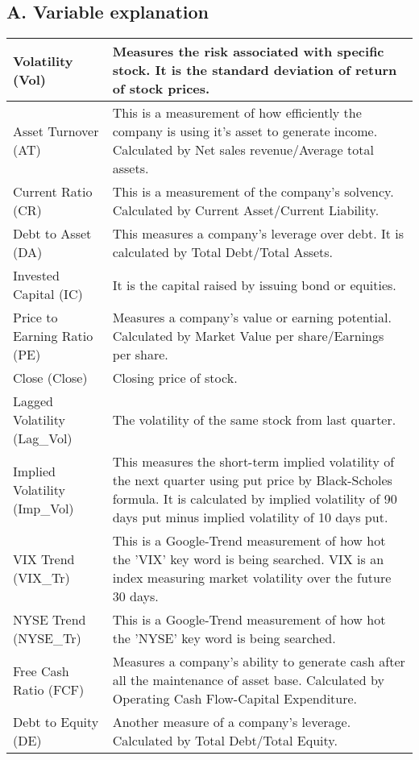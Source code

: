 \documentclass[b4paper]{article}
\begin{document}
\subsection{A. Variable explanation}
\begin{center}
\begin{tabular}{ |p{5cm} | p{10cm} | }
 \hline
Volatility (Vol) &  Measures the risk associated with specific stock. It is the standard deviation of return of stock prices. \\
 \hline
Asset Turnover (AT) & This is a measurement of how efficiently the company is using it's asset to generate income. Calculated by Net sales revenue/Average total assets. \\
 \hline
Current Ratio (CR) & This is a measurement of the company's solvency. Calculated by Current Asset/Current Liability.\\
 \hline
Debt to Asset (DA) & This measures a company's leverage over debt. It is calculated by Total Debt/Total Assets.\\
 \hline
Invested Capital (IC) & It is the capital raised by issuing bond or equities.\\
 \hline
Price to Earning Ratio (PE) & Measures a company's value or earning potential. Calculated by Market Value per share/Earnings per share.\\
 \hline
Close (Close) & Closing price of stock.\\
 \hline
Lagged Volatility (Lag\_Vol) & The volatility of the same stock from last quarter.\\
 \hline
Implied Volatility (Imp\_Vol) & This measures the short-term implied volatility of the next quarter using put price by Black-Scholes formula. It is calculated by implied volatility of 90 days put minus implied volatility of 10 days put.\\
 \hline
VIX Trend (VIX\_Tr) & This is a Google-Trend measurement of how hot the 'VIX' key word is being searched. VIX is an index measuring market volatility over the future 30 days.\\
 \hline
NYSE Trend (NYSE\_Tr) & This is a Google-Trend measurement of how hot the 'NYSE' key word is being searched.\\
 \hline
Free Cash Ratio (FCF) & Measures a company's ability to generate cash after all the maintenance of asset base. Calculated by Operating Cash Flow-Capital Expenditure. \\
 \hline
Debt to Equity (DE) & Another measure of a company's leverage. Calculated by Total Debt/Total Equity.\\
\hline
\end{tabular}
\end{center}
\end{document}
